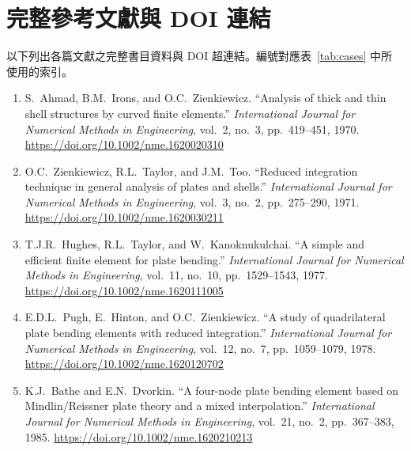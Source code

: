 \documentclass[a4paper,10pt]{article}
\begin{document}
\section{完整參考文獻與 DOI 連結}
\label{sec:refs}

以下列出各篇文獻之完整書目資料與 DOI 超連結。編號對應表~\ref{tab:cases} 中所
使用的索引。

\begin{enumerate}

    \item \label{ahmad1970}
    S.~Ahmad, B.M.~Irons, and O.C.~Zienkiewicz.
    ``Analysis of thick and thin shell structures by curved finite elements.''
    \emph{International Journal for Numerical Methods in Engineering},
    vol.~2, no.~3, pp.~419--451, 1970.
    \newline \url{https://doi.org/10.1002/nme.1620020310}

    \item \label{zienkiewicz1971}
    O.C.~Zienkiewicz, R.L.~Taylor, and J.M.~Too.
    ``Reduced integration technique in general analysis of plates and shells.''
    \emph{International Journal for Numerical Methods in Engineering},
    vol.~3, no.~2, pp.~275--290, 1971.
    \newline \url{https://doi.org/10.1002/nme.1620030211}

    \item \label{hughes1977}
    T.J.R.~Hughes, R.L.~Taylor, and W.~Kanoknukulchai.
    ``A simple and efficient finite element for plate bending.''
    \emph{International Journal for Numerical Methods in Engineering},
    vol.~11, no.~10, pp.~1529--1543, 1977.
    \newline \url{https://doi.org/10.1002/nme.1620111005}

    \item \label{pugh1978}
    E.D.L.~Pugh, E.~Hinton, and O.C.~Zienkiewicz.
    ``A study of quadrilateral plate bending elements with reduced integration.''
    \emph{International Journal for Numerical Methods in Engineering},
    vol.~12, no.~7, pp.~1059--1079, 1978.
    \newline \url{https://doi.org/10.1002/nme.1620120702}

    \item \label{bathe1985}
    K.J.~Bathe and E.N.~Dvorkin.
    ``A four-node plate bending element based on Mindlin/Reissner plate theory 
    and a mixed interpolation.''
    \emph{International Journal for Numerical Methods in Engineering},
    vol.~21, no.~2, pp.~367--383, 1985.
    \newline \url{https://doi.org/10.1002/nme.1620210213}


\end{enumerate}
\end{document}

